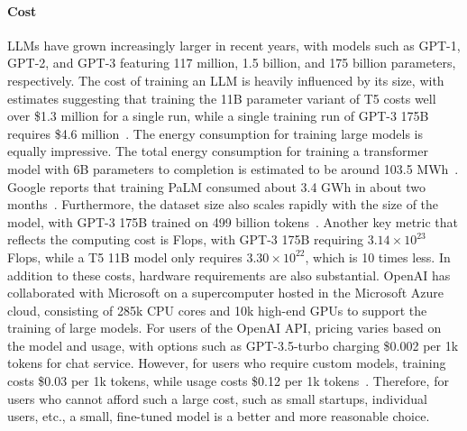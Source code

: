 \documentclass[manuscript,screen, nonacm]{acmart}
\begin{document}
\paragraph{Cost}
LLMs have grown increasingly larger in recent years, with models such as GPT-1, GPT-2, and GPT-3 featuring 117 million, 1.5 billion, and 175 billion parameters, respectively. The cost of training an LLM is heavily influenced by its size, with estimates suggesting that training the 11B parameter variant of T5 costs well over \$1.3 million for a single run, while a single training run of GPT-3 175B requires \$4.6 million~\cite{OpenAIsG17:online}.
The energy consumption for training large models is equally impressive. The total energy consumption for training a transformer model with 6B parameters to completion is estimated to be around 103.5 MWh~\cite{dodge2022measuring}. Google reports that training PaLM consumed about 3.4 GWh in about two months~\cite{ananthaswamy2023ai}.
Furthermore, the dataset size also scales rapidly with the size of the model, with GPT-3 175B trained on 499 billion tokens~\cite{brown2020language}. Another key metric that reflects the computing cost is Flops, with GPT-3 175B requiring $3.14 \times 10^{23}$ Flops, while a T5 11B model only requires $3.30 \times 10^{22}$, which is 10 times less.
In addition to these costs, hardware requirements are also substantial.
OpenAI has collaborated with Microsoft on a supercomputer hosted in the Microsoft Azure cloud, consisting of 285k CPU cores and 10k high-end GPUs to support the training of large models.
For users of the OpenAI API, pricing varies based on the model and usage, with options such as GPT-3.5-turbo charging \$0.002 per 1k tokens for chat service. However, for users who require custom models, training costs \$0.03 per 1k tokens, while usage costs \$0.12 per 1k tokens~\cite{Pricing84:online}.
Therefore, for users who cannot afford such a large cost, such as small startups, individual users, etc., a small, fine-tuned model is a better and more reasonable choice.
\end{document}

